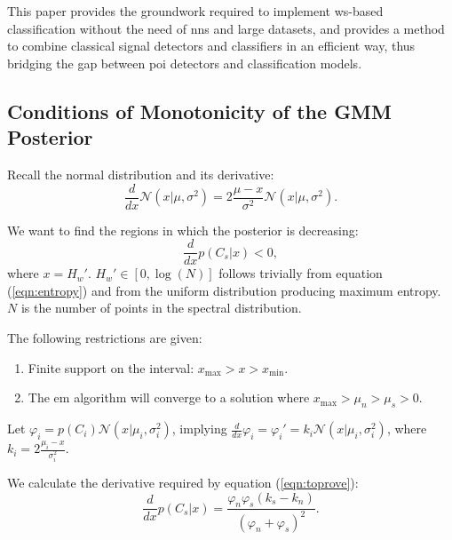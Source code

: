 {This paper provides the groundwork required to implement \ac{ws}-based classification without the need of \acp{nn} and large datasets, and provides a method to combine classical signal detectors and classifiers in an efficient way, thus bridging the gap between \ac{poi} detectors and classification models.


\clearpage

\begin{subappendices}

    \section{Conditions of Monotonicity of the GMM Posterior}
    \label{app:mono}
    Recall the normal distribution and its derivative:
    \begin{equation}
        \frac{d}{dx}\mathcal{N}(x|\mu,\sigma^2) = 2\frac{\mu -x}{\sigma^2} \mathcal{N}(x|\mu,\sigma^2).
    \end{equation}
    
    We want to find the regions in which the posterior is decreasing:
    \begin{equation}
        \label{eqn:toprove}
        \frac{d}{dx} p(C_s | x) < 0,
    \end{equation}
    where $x = H_w'$. $H_w' \in [0, \log(N)]$ follows trivially from equation (\ref{eqn:entropy}) and from the uniform distribution producing maximum entropy. $N$ is the number of points in the spectral distribution.
    
    
    The following restrictions are given:
    \begin{enumerate}
        \item Finite support on the interval: $ x_\text{max} > x > x_\text{min}.$
        \item The \ac{em} algorithm will converge to a solution where $x_\text{max} > \mu_n > \mu_s > 0.$
    \end{enumerate}
    
    Let $\varphi_i = p(C_i)\mathcal{N}(x|\mu_i,\sigma_i^2)$, implying $\frac{d}{dx}\varphi_i = \varphi_i' = k_i \mathcal{N}(x|\mu_i,\sigma_i^2)$, where $k_i = 2\frac{\mu_i - x}{\sigma_i^2}$.
    
    We calculate the derivative required by equation (\ref{eqn:toprove}):
    \begin{equation}
        \frac{d}{dx} p(C_s | x) = \frac{\varphi_n \varphi_s (k_s - k_n)}{(\varphi_n + \varphi_s)^2}.
    \end{equation}
    

\end{subappendices}}
